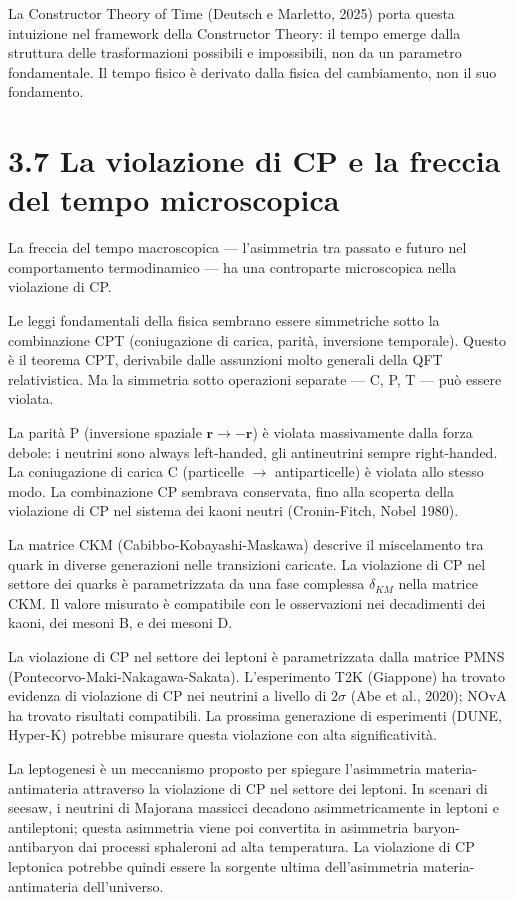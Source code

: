 \documentclass[11.5pt,a4paper,openany]{book}
\theoremstyle{remark}
\begin{document}
La Constructor Theory of Time (Deutsch e Marletto, 2025) porta questa intuizione nel framework della Constructor Theory: il tempo emerge dalla struttura delle trasformazioni possibili e impossibili, non da un parametro fondamentale. Il tempo fisico è derivato dalla fisica del cambiamento, non il suo fondamento.

\section{3.7 La violazione di CP e la freccia del tempo microscopica}

La freccia del tempo macroscopica --- l'asimmetria tra passato e futuro nel comportamento termodinamico --- ha una controparte microscopica nella violazione di CP.

Le leggi fondamentali della fisica sembrano essere simmetriche sotto la combinazione CPT (coniugazione di carica, parità, inversione temporale). Questo è il teorema CPT, derivabile dalle assunzioni molto generali della QFT relativistica. Ma la simmetria sotto operazioni separate --- C, P, T --- può essere violata.

La parità P (inversione spaziale $\mathbf{r} \to -\mathbf{r}$) è violata massivamente dalla forza debole: i neutrini sono always left-handed, gli antineutrini sempre right-handed. La coniugazione di carica C (particelle $\to$ antiparticelle) è violata allo stesso modo. La combinazione CP sembrava conservata, fino alla scoperta della violazione di CP nel sistema dei kaoni neutri (Cronin-Fitch, Nobel 1980).

La matrice CKM (Cabibbo-Kobayashi-Maskawa) descrive il miscelamento tra quark in diverse generazioni nelle transizioni caricate. La violazione di CP nel settore dei quarks è parametrizzata da una fase complessa $\delta_{KM}$ nella matrice CKM. Il valore misurato è compatibile con le osservazioni nei decadimenti dei kaoni, dei mesoni B, e dei mesoni D.

La violazione di CP nel settore dei leptoni è parametrizzata dalla matrice PMNS (Pontecorvo-Maki-Nakagawa-Sakata). L'esperimento T2K (Giappone) ha trovato evidenza di violazione di CP nei neutrini a livello di $2\sigma$ (Abe et al., 2020); NOvA ha trovato risultati compatibili. La prossima generazione di esperimenti (DUNE, Hyper-K) potrebbe misurare questa violazione con alta significatività.

La leptogenesi è un meccanismo proposto per spiegare l'asimmetria materia-antimateria attraverso la violazione di CP nel settore dei leptoni. In scenari di seesaw, i neutrini di Majorana massicci decadono asimmetricamente in leptoni e antileptoni; questa asimmetria viene poi convertita in asimmetria baryon-antibaryon dai processi sphaleroni ad alta temperatura. La violazione di CP leptonica potrebbe quindi essere la sorgente ultima dell'asimmetria materia-antimateria dell'universo.
\end{document}
